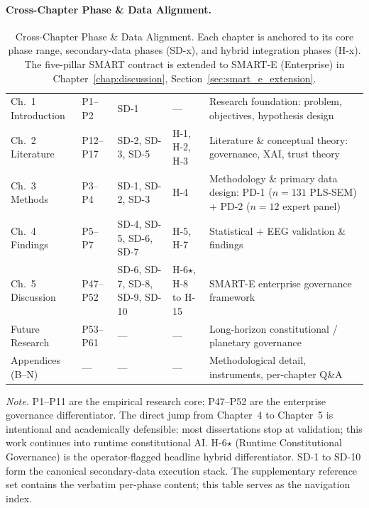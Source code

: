 \paragraph{Cross-Chapter Phase \& Data Alignment.}



{\tablestripes\tablefontsize

\begin{xltabular}{\textwidth}{@{} >{\raggedright\arraybackslash}p{2.5cm} >{\raggedright\arraybackslash}p{2.0cm} >{\raggedright\arraybackslash}p{2.5cm} >{\raggedright\arraybackslash}p{2.1cm} p{5.0cm} @{}}
\caption[Cross-Chapter Phase \& Data Alignment]{Cross-Chapter Phase \& Data Alignment. Each chapter is anchored to its core phase range, secondary-data phases (SD-x), and hybrid integration phases (H-x). The five-pillar SMART contract is extended to SMART-E (Enterprise) in Chapter~\ref{chap:discussion}, Section~\ref{sec:smart_e_extension}.}\label{tab:chapter_phase_alignment} \\
\toprule
{} &  &  &  &  \\
\midrule
\endfirsthead
\endhead
\bottomrule
\endlastfoot
Ch.~1 Introduction & P1--P2 & SD-1 & --- & Research foundation: problem, objectives, hypothesis design \\
Ch.~2 Literature & P12--P17 & SD-2, SD-3, SD-5 & H-1, H-2, H-3 & Literature \& conceptual theory: governance, XAI, trust theory \\
Ch.~3 Methods & P3--P4 & SD-1, SD-2, SD-3 & H-4 & Methodology \& primary data design: PD-1 ($n{=}131$ PLS-SEM) + PD-2 ($n{=}12$ expert panel) \\
Ch.~4 Findings & P5--P7 & SD-4, SD-5, SD-6, SD-7 & H-5, H-7 & Statistical + EEG validation \& findings \\
Ch.~5 Discussion & P47--P52 & SD-6, SD-7, SD-8, SD-9, SD-10 & H-6$\star$, H-8 to H-15 & SMART-E enterprise governance framework \\
Future Research & P53--P61 & --- & --- & Long-horizon constitutional / planetary governance \\
Appendices (B--N) & --- & --- & --- & Methodological detail, instruments, per-chapter Q\&A \\
\end{xltabular}}
\vspace{0.5em}
\noindent\textit{Note.} P1--P11 are the empirical research core; P47--P52 are the enterprise governance differentiator. The direct jump from Chapter~4 to Chapter~5 is intentional and academically defensible: most dissertations stop at validation; this work continues into runtime constitutional AI. H-6$\star$ (Runtime Constitutional Governance) is the operator-flagged headline hybrid differentiator. SD-1 to SD-10 form the canonical secondary-data execution stack. The supplementary reference set contains the verbatim per-phase content; this table serves as the navigation index.

